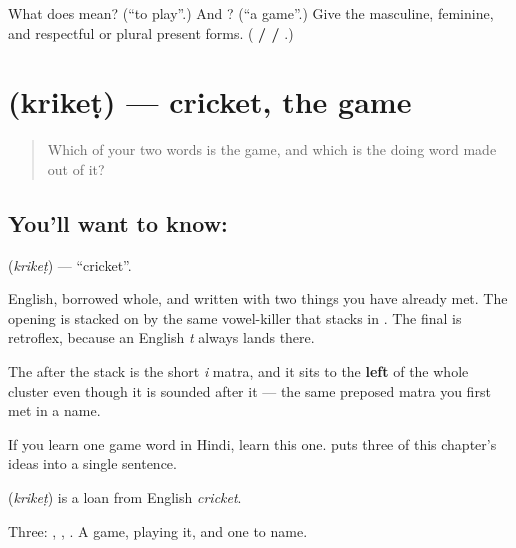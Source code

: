 \begin{tcolorbox}[breakable,colback=teal!4,colframe=teal!35!black,title={Before you move on}]
What does  mean? (\textquotedblleft{}to play\textquotedblright{}.) And ? (\textquotedblleft{}a game\textquotedblright{}.) Give the masculine, feminine, and respectful or plural present forms. (\textbf{ /  / }.)
\end{tcolorbox}
\section[\texorpdfstring{\hi{क्रिकेट} (krikeṭ)}{क्रिकेट (krikeṭ)}]{ (krikeṭ) — cricket, the game}

\label{lesson:HI-C70-cricket}



\begin{quote}
Which of your two words is the game, and which is the doing word made out of it?
\end{quote}

\subsection*{You'll want to know: }
\textbf{} (\emph{krikeṭ}) — \textquotedblleft{}cricket\textquotedblright{}.

English, borrowed whole, and written with two things you have already met. The opening  is  stacked on  by the same vowel-killer  that stacks  in . The final  is retroflex, because an English \emph{t} always lands there.

The  after the stack is the short \emph{i} matra, and it sits to the \textbf{left} of the whole cluster even though it is sounded after it — the same preposed matra you first met in a name.

If you learn one game word in Hindi, learn this one. \textbf{   } puts three of this chapter's ideas into a single sentence.

\begin{cousinweb}
\textbf{} (\emph{krikeṭ}) is a loan from English \emph{cricket}.
\end{cousinweb}

\begin{grammarlens}[title={What you've built}]
Three: , , . A game, playing it, and one to name.
\end{grammarlens}

